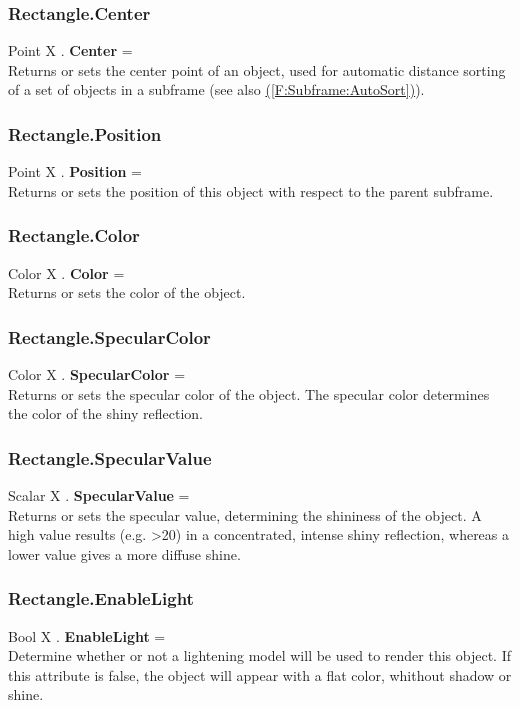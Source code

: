 \documentclass[10pt]{book}
\newcommand{\linkitem}[1]{\hyperref[#1]{\nameref{#1} (\ref{#1})}}
\begin{document}
\subsubsection{Rectangle.Center \label{F:Rectangle:Center}}
Point X . \textbf{Center} = \\
Returns or sets the center point of an object, used for automatic distance sorting of a set of objects in a subframe (see also \linkitem{F:Subframe:AutoSort}).

\subsubsection{Rectangle.Position \label{F:Rectangle:Position}}
Point X . \textbf{Position} = \\
Returns or sets the position of this object with respect to the parent subframe.

\subsubsection{Rectangle.Color \label{F:Rectangle:Color}}
Color X . \textbf{Color} = \\
Returns or sets the color of the object.

\subsubsection{Rectangle.SpecularColor \label{F:Rectangle:SpecularColor}}
Color X . \textbf{SpecularColor} = \\
Returns or sets the specular color of the object. The specular color determines the color of the shiny reflection.

\subsubsection{Rectangle.SpecularValue \label{F:Rectangle:SpecularValue}}
Scalar X . \textbf{SpecularValue} = \\
Returns or sets the specular value, determining the shininess of the object. A high value results (e.g. >20) in a concentrated, intense shiny reflection, whereas a lower value gives a more diffuse shine.

\subsubsection{Rectangle.EnableLight \label{F:Rectangle:EnableLight}}
Bool X . \textbf{EnableLight} = \\
Determine whether or not a lightening model will be used to render this object. If this attribute is false, the object will appear with a flat color, whithout shadow or shine.
\end{document}
